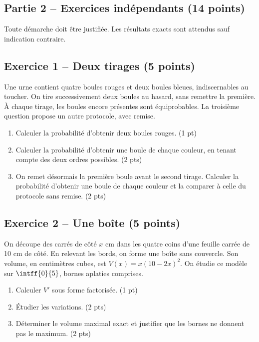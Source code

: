 \mxnewpage\subsection*{Partie 2 -- Exercices indépendants (14 points)}
Toute démarche doit être justifiée. Les résultats exacts sont attendus sauf indication contraire.
\subsection*{Exercice 1 -- Deux tirages (5 points)}
Une urne contient quatre boules rouges et deux boules bleues, indiscernables au toucher. On tire successivement deux boules au hasard, sans remettre la première. À chaque tirage, les boules encore présentes sont équiprobables. La troisième question propose un autre protocole, avec remise.
\begin{enumerate}
\item Calculer la probabilité d’obtenir deux boules rouges. \hfill(1 pt)
\item Calculer la probabilité d’obtenir une boule de chaque couleur, en tenant compte des deux ordres possibles. \hfill(2 pts)
\item On remet désormais la première boule avant le second tirage. Calculer la probabilité d’obtenir une boule de chaque couleur et la comparer à celle du protocole sans remise. \hfill(2 pts)
\end{enumerate}
\subsection*{Exercice 2 -- Une boîte (5 points)}
On découpe des carrés de côté $x$ cm dans les quatre coins d’une feuille carrée de 10 cm de côté. En relevant les bords, on forme une boîte sans couvercle. Son volume, en centimètres cubes, est $V(x)=x(10-2x)^2$. On étudie ce modèle sur $\intff{0}{5}$, bornes aplaties comprises.
\begin{enumerate}
\item Calculer $V\prime$ sous forme factorisée. \hfill(1 pt)
\item Étudier les variations. \hfill(2 pts)
\item Déterminer le volume maximal exact et justifier que les bornes ne donnent pas le maximum. \hfill(2 pts)
\end{enumerate}
